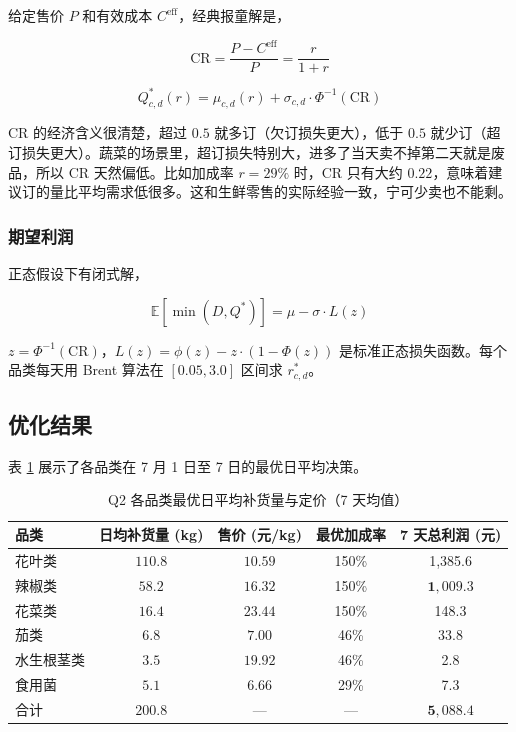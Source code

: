 给定售价 $P$ 和有效成本 $C^{\text{eff}}$，经典报童解是，

\begin{equation}
\text{CR} = \frac{P - C^{\text{eff}}}{P} = \frac{r}{1 + r}
\end{equation}

\begin{equation}
Q_{c,d}^*(r) = \mu_{c,d}(r) + \sigma_{c,d} \cdot \Phi^{-1}(\text{CR})
\end{equation}

CR 的经济含义很清楚，超过 $0.5$ 就多订（欠订损失更大），低于 $0.5$ 就少订（超订损失更大）。蔬菜的场景里，超订损失特别大，进多了当天卖不掉第二天就是废品，所以 CR 天然偏低。比如加成率 $r=29\%$ 时，CR 只有大约 $0.22$，意味着建议订的量比平均需求低很多。这和生鲜零售的实际经验一致，宁可少卖也不能剩。

\subsubsection{期望利润}

正态假设下有闭式解，

\begin{equation}
\mathbb{E}[\min(D, Q^*)] = \mu - \sigma \cdot L(z)
\end{equation}

$z = \Phi^{-1}(\text{CR})$，$L(z) = \phi(z) - z \cdot (1 - \Phi(z))$ 是标准正态损失函数。每个品类每天用 Brent 算法在 $[0.05, 3.0]$ 区间求 $r_{c,d}^*$。

\subsection{优化结果}

表 \ref{tab:q2_results} 展示了各品类在 7 月 1 日至 7 日的最优日平均决策。

\begin{table}[H]
\centering
\caption{Q2 各品类最优日平均补货量与定价（7 天均值）}
\label{tab:q2_results}
\begin{tabular}{lcccc}
\hline
品类 & 日均补货量 (kg) & 售价 (元/kg) & 最优加成率 & 7 天总利润 (元) \\
\hline
花叶类 & $\mathbf{110.8}$ & $10.59$ & 150\% & 1,385.6 \\
辣椒类 & $58.2$ & $16.32$ & 150\% & $\mathbf{1,009.3}$ \\
花菜类 & $16.4$ & $23.44$ & 150\% & 148.3 \\
茄类 & $6.8$ & $7.00$ & 46\% & 33.8 \\
水生根茎类 & $3.5$ & $19.92$ & 46\% & 2.8 \\
食用菌 & $5.1$ & $6.66$ & 29\% & 7.3 \\
\hline
合计 & $\mathbf{200.8}$ & — & — & $\mathbf{5,088.4}$ \\
\hline
\end{tabular}
\end{table}

